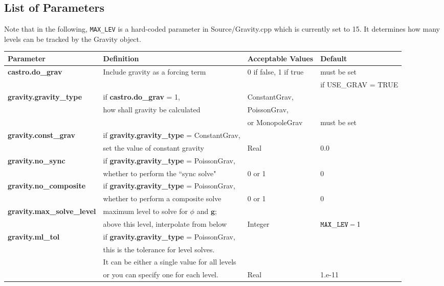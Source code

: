 \subsection{List of Parameters}

Note that in the following, {\tt MAX\_LEV} is a hard-coded
parameter in Source/Gravity.cpp which is currently set to 15.
It determines how many levels can be tracked by the Gravity object.

\begin{table*}[h]
\begin{scriptsize}
\begin{center}
\begin{tabular}{|l|l|l|l|} \hline
Parameter & Definition & Acceptable Values &Default\\
\hline
{\bf castro.do\_grav}  & Include gravity as a forcing term & 0 if false, 1 if true & must be set \\
& & & if USE\_GRAV = TRUE  \\
\hline
{\bf gravity.gravity\_type} & if {\bf castro.do\_grav} = 1, & ConstantGrav, & \\
& how shall gravity be calculated & PoissonGrav, & \\
& & or MonopoleGrav & must be set \\
\hline
{\bf gravity.const\_grav} & if {\bf gravity.gravity\_type} = ConstantGrav, & & \\
& set the value of constant gravity & Real & 0.0 \\
\hline
{\bf gravity.no\_sync} & if {\bf gravity.gravity\_type} = PoissonGrav, & & \\
& whether to perform the ``sync solve" &  0 or 1 & 0 \\
\hline
{\bf gravity.no\_composite} & if {\bf gravity.gravity\_type} = PoissonGrav, & & \\
& whether to perform a composite solve & 0 or 1 & 0 \\
\hline
{\bf gravity.max\_solve\_level} & maximum level to solve for $\phi$ and $\mathbf{g}$; & & \\
& above this level, interpolate from below & Integer & ${\tt MAX\_LEV} - 1$ \\
\hline
{\bf gravity.ml\_tol} & if {\bf gravity.gravity\_type} = PoissonGrav, & & \\
& this is the tolerance for level solves. & & \\
& It can be either a single value for all levels & & \\
& or you can specify one for each level. & Real & 1.e-11 \\

\end{tabular}
\end{center}
\end{scriptsize}
\end{table*}
